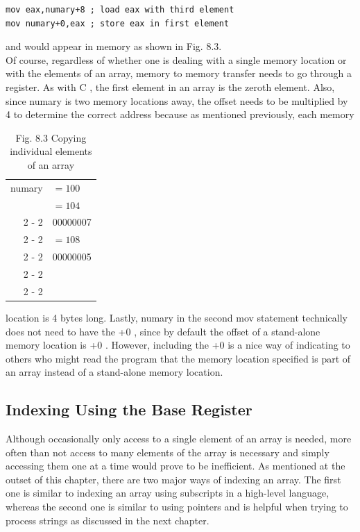 \documentclass[10pt]{article}
\begin{document}
\begin{verbatim}
mov eax,numary+8 ; load eax with third element
mov numary+0,eax ; store eax in first element
\end{verbatim}

and would appear in memory as shown in Fig. 8.3.\\
Of course, regardless of whether one is dealing with a single memory location or with the elements of an array, memory to memory transfer needs to go through a register. As with C , the first element in an array is the zeroth element. Also, since numary is two memory locations away, the offset needs to be multiplied by 4 to determine the correct address because as mentioned previously, each memory

\begin{table}[h]
\begin{center}
\begin{tabular}{rl|}
numary & $=100$ \\
 & $=104$ \\
\cline { 2 - 2 }
 & 00000007 \\
\cline { 2 - 2 }
 & $=108$ \\
\cline { 2 - 2 }
 & 00000005 \\
\cline { 2 - 2 }
 &  \\
\cline { 2 - 2 }
\end{tabular}
\captionsetup{labelformat=empty}
\caption{Fig. 8.3 Copying individual elements of an array}
\end{center}
\end{table}

location is 4 bytes long. Lastly, numary in the second mov statement technically does not need to have the +0 , since by default the offset of a stand-alone memory location is +0 . However, including the +0 is a nice way of indicating to others who might read the program that the memory location specified is part of an array instead of a stand-alone memory location.

\subsection*{Indexing Using the Base Register}
Although occasionally only access to a single element of an array is needed, more often than not access to many elements of the array is necessary and simply accessing them one at a time would prove to be inefficient. As mentioned at the outset of this chapter, there are two major ways of indexing an array. The first one is similar to indexing an array using subscripts in a high-level language, whereas the second one is similar to using pointers and is helpful when trying to process strings as discussed in the next chapter.
\end{document}
